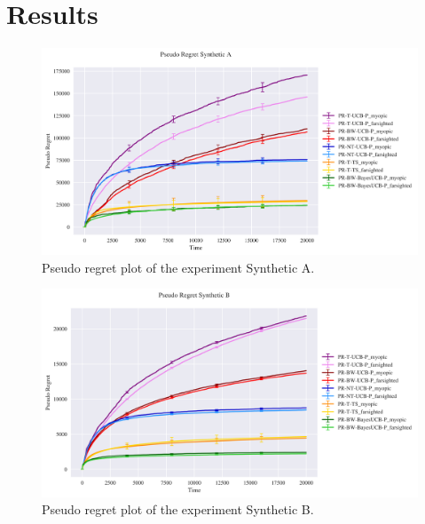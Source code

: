 \section{Results}

\begin{figure}[H]
	\includegraphics[width=16cm]{./images/ANALYTICS/experiment_A ANALYTICS.png}
	\centering	
	\caption{Pseudo regret plot of the experiment Synthetic A.}
\end{figure}
\begin{figure}[H]
	\includegraphics[width=16cm]{./images/ANALYTICS/experiment_B ANALYTICS.png}
	\centering	
	\caption{Pseudo regret plot of the experiment Synthetic B. }
\end{figure}

